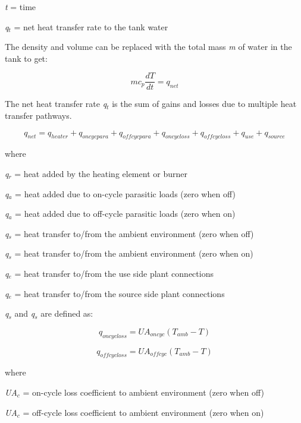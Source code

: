 \emph{t} = time

\emph{q\(_{t}\)} = net heat transfer rate to the tank water

The density and volume can be replaced with the total mass \emph{m} of water in the tank to get:

\begin{equation}
m{c_p}\frac{{dT}}{{dt}} = {q_{net}}
\end{equation}

The net heat transfer rate \emph{q\(_{t}\)} is the sum of gains and losses due to multiple heat transfer pathways.

\begin{equation}
{q_{net}} = {q_{heater}} + {q_{oncycpara}} + {q_{offcycpara}} + {q_{oncycloss}} + {q_{offcycloss}} + {q_{use}} + {q_{source}}
\end{equation}

where

\emph{q\(_{r}\)} = heat added by the heating element or burner

\emph{q\(_{a}\)} = heat added due to on-cycle parasitic loads (zero when off)

\emph{q\(_{a}\)} = heat added due to off-cycle parasitic loads (zero when on)

\emph{q\(_{s}\)} = heat transfer to/from the ambient environment (zero when off)

\emph{q\(_{s}\)} = heat transfer to/from the ambient environment (zero when on)

\emph{q\(_{e}\)} = heat transfer to/from the use side plant connections

\emph{q\(_{e}\)} = heat transfer to/from the source side plant connections

\emph{q\(_{s}\)} and \emph{q\(_{s}\)} are defined as:

\begin{equation}
{q_{oncycloss}} = U{A_{oncyc}}\left( {{T_{amb}} - T} \right)
\end{equation}

\begin{equation}
{q_{offcycloss}} = U{A_{offcyc}}\left( {{T_{amb}} - T} \right)
\end{equation}

where

\emph{UA\(_{c}\)} = on-cycle loss coefficient to ambient environment (zero when off)

\emph{UA\(_{c}\)} = off-cycle loss coefficient to ambient environment (zero when on)

